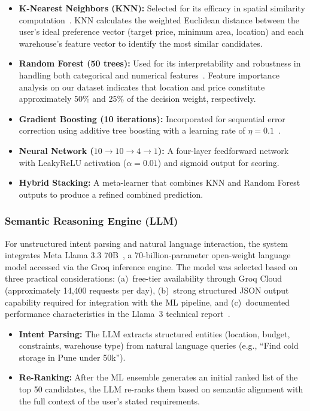 \documentclass[pdflatex,sn-mathphys-num]{sn-jnl}
\theoremstyle{thmstyleone}
\theoremstyle{thmstyletwo}
\theoremstyle{thmstylethree}
\begin{document}
\begin{itemize}
    \item \textbf{K-Nearest Neighbors (KNN):} Selected for its efficacy in spatial similarity computation~\cite{b11}. KNN calculates the weighted Euclidean distance between the user's ideal preference vector (target price, minimum area, location) and each warehouse's feature vector to identify the most similar candidates.

    \item \textbf{Random Forest (50 trees):} Used for its interpretability and robustness in handling both categorical and numerical features~\cite{b6}. Feature importance analysis on our dataset indicates that location and price constitute approximately 50\% and 25\% of the decision weight, respectively.

    \item \textbf{Gradient Boosting (10 iterations):} Incorporated for sequential error correction using additive tree boosting with a learning rate of $\eta = 0.1$~\cite{b12}.

    \item \textbf{Neural Network ($10 \rightarrow 10 \rightarrow 4 \rightarrow 1$):} A four-layer feedforward network with LeakyReLU activation ($\alpha = 0.01$) and sigmoid output for scoring.

    \item \textbf{Hybrid Stacking:} A meta-learner that combines KNN and Random Forest outputs to produce a refined combined prediction.
\end{itemize}

\subsubsection{Semantic Reasoning Engine (LLM)}\label{subsubsec:llm}

For unstructured intent parsing and natural language interaction, the system integrates Meta Llama 3.3 70B~\cite{b13}, a 70-billion-parameter open-weight language model accessed via the Groq inference engine. The model was selected based on three practical considerations: (a)~free-tier availability through Groq Cloud (approximately 14,400 requests per day), (b)~strong structured JSON output capability required for integration with the ML pipeline, and (c)~documented performance characteristics in the Llama~3 technical report~\cite{b13}.

\begin{itemize}
    \item \textbf{Intent Parsing:} The LLM extracts structured entities (location, budget, constraints, warehouse type) from natural language queries (e.g., ``Find cold storage in Pune under 50k'').

    \item \textbf{Re-Ranking:} After the ML ensemble generates an initial ranked list of the top 50 candidates, the LLM re-ranks them based on semantic alignment with the full context of the user's stated requirements.
\end{itemize}
\end{document}
